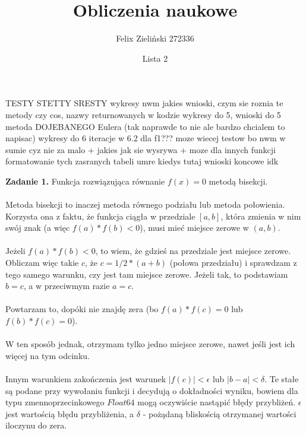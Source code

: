 \documentclass[15pt, a4paper]{article}
\title{Obliczenia naukowe}
\author{Felix Zieliński 272336}
\date{Lista 2}
\begin{document}
\maketitle

\noindent TESTY STETTY SRESTY
wykresy 
nwm jakies wnioski, czym sie roznia te metody czy cos, nazwy returnowanych w kodzie
wykresy do 5, wnioski do 5\\
metoda DOJEBANEGO Eulera (tak naprawde to nie ale bardzo chcialem to napisac)
wykresy do 6
iteracje w 6.2 dla f1???
moze wiecej testow bo nwm w sumie cyz nie za malo + jakies jak sie wysrywa + moze dla innych funkcji
formatowanie tych zasranych tabeli umre kiedys tutaj
wnioski koncowe idk

\vspace{0.5cm}

\noindent\hrulefill

\vspace{0.5cm}


\noindent\textbf{Zadanie 1.} Funkcja rozwiązująca równanie \( f(x) = 0 \) metodą bisekcji.\\\\
\noindent Metoda bisekcji to inaczej metoda równego podziału lub metoda połowienia. 
Korzysta ona z faktu, że funkcja ciągła w przedziale \( [a, b] \), która zmienia w nim swój znak (a więc \( f(a) * f(b) < 0 \)), musi mieć miejsce zerowe w \( (a, b) \).\\\\
\noindent Jeżeli \( f(a) * f(b) < 0 \), to wiem, że gdzieś na przedziale jest miejsce zerowe. Obliczam więc takie \(c\), że \( c = 1/2 * (a + b) \) (połowa przedziału) i sprawdzam z tego samego warunku, czy jest tam miejsce zerowe. Jeżeli tak, to podstawiam \( b = c \), a w przeciwmym razie \( a = c \).\\\\
\noindent Powtarzam to, dopóki nie znajdę zera (bo \( f(a) * f(c) = 0 \) lub \(f(b) * f(c) = 0 \)). \\\\
\noindent W ten sposób jednak, otrzymam tylko jedno miejsce zerowe, nawet jeśli jest ich więcej na tym odcinku.\\\\ 
\noindent Innym warunkiem zakończenia jest warunek \(|f(c)| < \epsilon \) lub \(|b - a| < \delta \). Te stałe są podane przy wywołaniu funkcji i decydują o dokładności wyniku, bowiem dla typu zmennoprzecinkowego \(Float64\) mogą oczywiście nastąpić błędy przybliżeń. \( \epsilon \) jest wartością błędu przybliżenia, a \(\delta\) - pożądaną bliskością otrzymanej wartości iloczynu do zera. 
\end{document}
